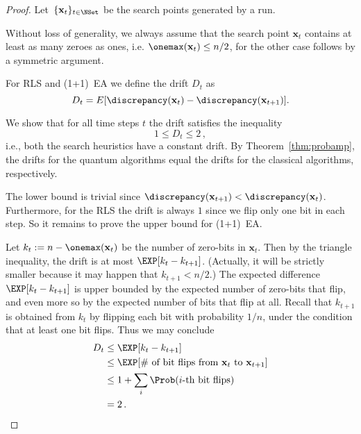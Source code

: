 \begin{proof}
Let~$\{\mathbf{x}_t\}_{t\in\NSet}$ be the search points generated by a run.

Without loss of generality, we always assume that the search point $\mathbf{x}_t$ contains at least as many zeroes as ones, i.e. $\onemax(\mathbf{x}_t) \le n/2$, for the other case follows by a symmetric argument. 
% 

For RLS and (1+1)~EA we define the drift $D_t$ as
\[ 
D_t =
E[\discrepancy(\mathbf{x}_t)-\discrepancy(\mathbf{x}_{t+1})].\]

We show that for all time steps $t$ the drift satisfies the inequality
\begin{equation}\label{eq:drift}
 1\le D_t\le 2\,,
\end{equation}
i.e., both the search heuristics have a constant
drift. By Theorem~\ref{thm:probamp}, the drifts for the quantum
algorithms equal the drifts for the classical algorithms,
respectively.

The lower bound is trivial since
$\discrepancy(\mathbf{x}_{t+1})<\discrepancy(\mathbf{x}_{t})$. Furthermore,
for the RLS the drift is always $1$ since we flip only one bit in
each step.  So it remains to prove the upper bound for (1+1)~EA.

Let $k_t := n-\onemax(\mathbf{x}_t)$ be the number of zero-bits in $\mathbf{x}_t$. Then by the triangle inequality, the drift is at most $\EXP[k_{t}-k_{t+1}]$. (Actually, it will be strictly smaller because it may happen that $k_{t+1} < n/2$.) The expected difference $\EXP[k_{t}-k_{t+1}]$ is upper bounded by the expected number of zero-bits that flip, and even more so by the expected number of bits that flip at all. Recall that $k_{t+1}$ is obtained from $k_t$ by flipping each bit with probability $1/n$, under the condition that at least one bit flips. Thus we may conclude
\begin{align*}
D_t & \le  \EXP[k_{t}-k_{t+1}] \\
& \le  \EXP[\#\text{ of bit flips from } \mathbf{x}_t\text{ to }\mathbf{x}_{t+1}] \\
& \le  1+\sum_{i}\Prob(i\text{-th bit flips})\\
& = 2\,.\\
\end{align*}


\end{proof}
